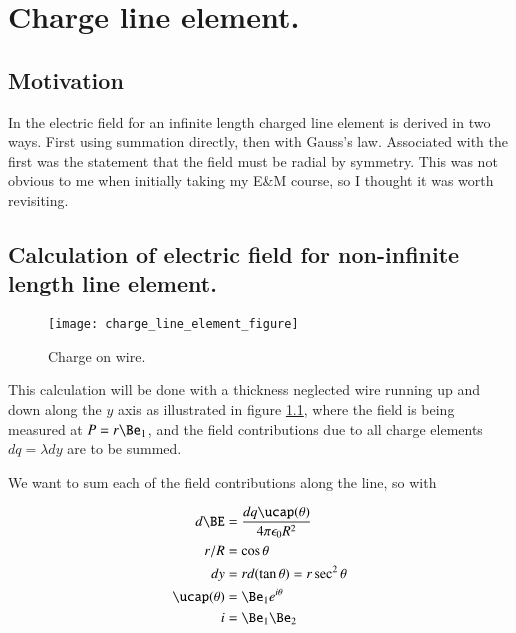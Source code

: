 \chapter{Charge line element.}

\section{Motivation}

In \cite{purcell1963eam} the electric field for an infinite length charged line element is derived in two ways.  First using summation directly, then with Gauss's law.  Associated with the first was the statement that the field must be radial by symmetry.  This was not obvious to me when initially taking my E\&M course, so I thought it was worth revisiting.

\section{Calculation of electric field for non-infinite length line element. }

\begin{figure}[htp]
\centering
\texttt{[image: charge\_line\_element\_figure]}
\caption{Charge on wire.}\label{fig:chargeLineElement}
\end{figure}

This calculation will be done with a thickness neglected wire running up and down along the $y$ axis as illustrated 
in figure \ref{fig:chargeLineElement}, where the field is being measured at $P = r \Be_1$, and the field contributions
due to all charge elements $dq = \lambda dy$ are to be summed.

We want to sum each of the field contributions along the line, so with

\begin{align*}
d\BE &= \frac{dq \ucap(\theta)}{4 \pi \epsilon_0 R^2} \\
r/R &= \cos\theta \\
dy &= r d(\tan\theta) = r \sec^2 \theta \\
\ucap(\theta) &= \Be_1 e^{i \theta} \\
i &= \Be_1 \Be_2 
\end{align*}

%

